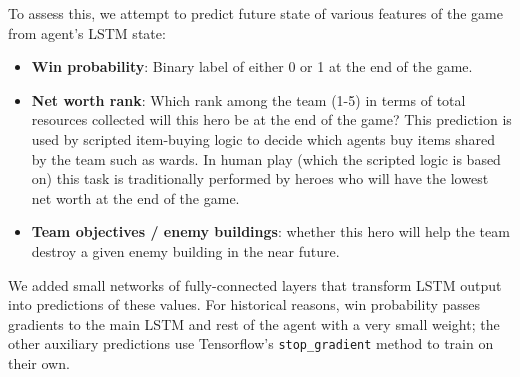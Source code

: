 \documentclass[ocean-paper.tex]{subfiles}
\begin{document}
To assess this, we attempt to predict future state of various features of the game from agent's LSTM state:
\begin{itemize}
\item \textbf{Win probability}: Binary label of either 0 or 1 at the end of the game.
\item \textbf{Net worth rank}: Which rank among the team (1-5) in terms of total resources collected will this hero be at the end of the game? This prediction is used by scripted item-buying logic to decide which agents buy items shared by the team such as wards. 
In human play (which the scripted logic is based on) this task is traditionally performed by heroes who will have the lowest net worth at the end of the game.
\item \textbf{Team objectives / enemy buildings}: whether this hero will help the team destroy a given enemy building in the near future.
\end{itemize}

We added small networks of fully-connected layers that transform LSTM output into predictions of these values.
For historical reasons, win probability passes gradients to the main LSTM and rest of the agent with a very small weight; the other auxiliary
predictions use Tensorflow's \texttt{stop\_gradient} method to train on their own.
\end{document}
